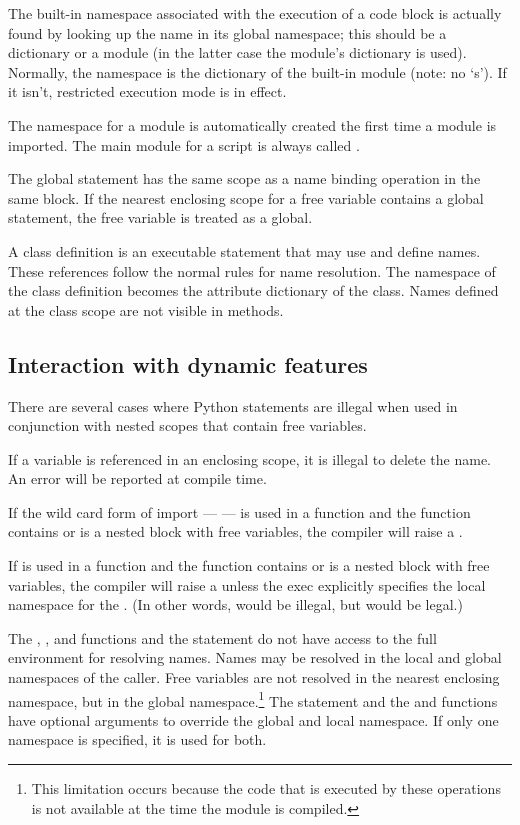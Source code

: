 The built-in namespace associated with the execution of a code block
is actually found by looking up the name  in its
global namespace; this should be a dictionary or a module (in the
latter case the module's dictionary is used).  Normally, the
 namespace is the dictionary of the built-in module
 (note: no `s').  If it isn't, restricted
execution mode is in effect.

The namespace for a module is automatically created the first time a
module is imported.  The main module for a script is always called
.

The global statement has the same scope as a name binding operation
in the same block.  If the nearest enclosing scope for a free variable
contains a global statement, the free variable is treated as a global.

A class definition is an executable statement that may use and define
names.  These references follow the normal rules for name resolution.
The namespace of the class definition becomes the attribute dictionary
of the class.  Names defined at the class scope are not visible in
methods. 

\subsection{Interaction with dynamic features \label{dynamic-features}}

There are several cases where Python statements are illegal when
used in conjunction with nested scopes that contain free
variables.

If a variable is referenced in an enclosing scope, it is illegal
to delete the name.  An error will be reported at compile time.

If the wild card form of import ---  --- is used in a
function and the function contains or is a nested block with free
variables, the compiler will raise a .

If  is used in a function and the function contains or
is a nested block with free variables, the compiler will raise a
 unless the exec explicitly specifies the local
namespace for the .  (In other words, 
would be illegal, but  would be legal.)

The , , and 
functions and the  statement do not have access to the
full environment for resolving names.  Names may be resolved in the
local and global namespaces of the caller.  Free variables are not
resolved in the nearest enclosing namespace, but in the global
namespace.\footnote{This limitation occurs because the code that is
    executed by these operations is not available at the time the
    module is compiled.}
The  statement and the  and
 functions have optional arguments to override
the global and local namespace.  If only one namespace is specified,
it is used for both.

